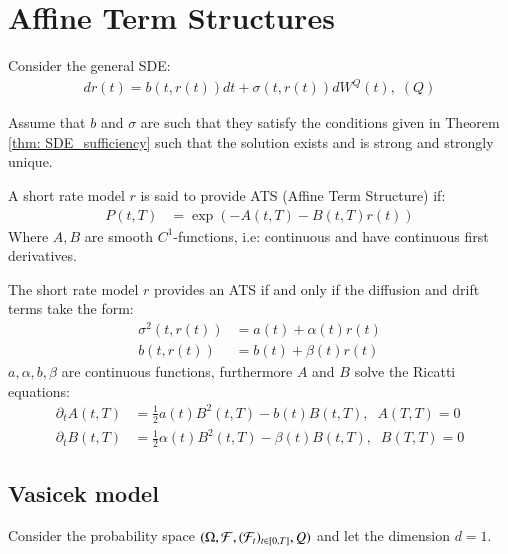 \newpage 

\section{Affine Term Structures}

Consider the general SDE:
\begin{align}
\label{eq: general_interest_rate_SDE}
dr(t) = b(t,r(t))dt + \sigma(t,r(t))dW^{Q}(t), \; (Q)    
\end{align}



Assume that $b$ and $\sigma$ are such that they satisfy the conditions given in Theorem \ref{thm: SDE_sufficiency} such that the solution exists and is strong and strongly unique. 

\begin{definition}
A short rate model $r$ is said to provide ATS (Affine Term Structure) 
if: 
\begin{align*}
P(t,T) &= \exp\left(
-A(t,T)-B(t,T)r(t)
\right)    
\end{align*}
Where $A, B$ are smooth $C^{1}$-functions, i.e: continuous and have continuous first derivatives.  
\end{definition}

\begin{proposition}
\label{prop: condition_on_r_ATS}
The short rate model $r$ provides an ATS if and only if the diffusion and drift terms take the form: 
\begin{align*}
\sigma^{2}(t,r(t)) &= a(t) + \alpha(t)r(t) \\ 
b(t,r(t)) &= b(t) + \beta(t)r(t)
\end{align*}
$a, \alpha, b, \beta$ are continuous functions, furthermore $A$ and $B$ solve the Ricatti equations: 
\begin{align*}
\partial_{t}A(t,T) &= \frac{1}{2}a(t)B^{2}(t,T) - b(t)B(t,T), \;\; A(T,T) = 0 \\ 
\partial_{t}B(t,T) &= \frac{1}{2}\alpha(t)B^{2}(t,T) - \beta(t)B(t,T), \;\; B(T,T) = 0
\end{align*}
\end{proposition}

\subsection{Vasicek model}
Consider the probability space $(\Omega, \mathcal{F}, (\mathcal{F}_{t})_{t \in[0,T]}, Q)$ and let the dimension $d = 1$.


